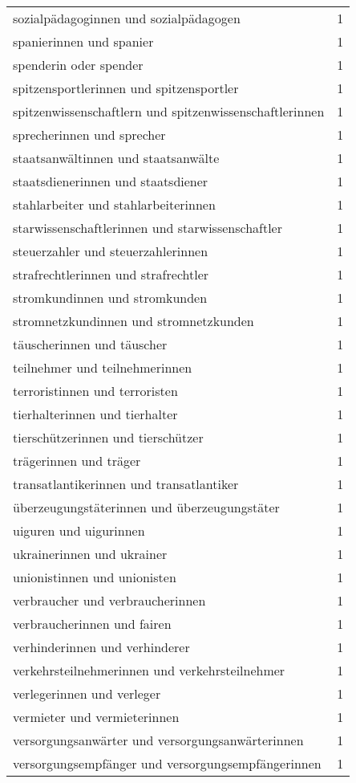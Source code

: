 \begin{tabular}{ll}
sozialpädagoginnen und sozialpädagogen & 1\\
spanierinnen und spanier & 1\\
spenderin oder spender & 1\\
spitzensportlerinnen und spitzensportler & 1\\
spitzenwissenschaftlern und spitzenwissenschaftlerinnen & 1\\
sprecherinnen und sprecher & 1\\
staatsanwältinnen und staatsanwälte & 1\\
staatsdienerinnen und staatsdiener & 1\\
stahlarbeiter und stahlarbeiterinnen & 1\\
starwissenschaftlerinnen und starwissenschaftler & 1\\
steuerzahler und steuerzahlerinnen & 1\\
strafrechtlerinnen und strafrechtler & 1\\
stromkundinnen und stromkunden & 1\\
stromnetzkundinnen und stromnetzkunden & 1\\
täuscherinnen und täuscher & 1\\
teilnehmer und teilnehmerinnen & 1\\
terroristinnen und terroristen & 1\\
tierhalterinnen und tierhalter & 1\\
tierschützerinnen und tierschützer & 1\\
trägerinnen und träger & 1\\
transatlantikerinnen und transatlantiker & 1\\
überzeugungstäterinnen und überzeugungstäter & 1\\
uiguren und uigurinnen & 1\\
ukrainerinnen und ukrainer & 1\\
unionistinnen und unionisten & 1\\
verbraucher und verbraucherinnen & 1\\
verbraucherinnen und fairen & 1\\
verhinderinnen und verhinderer & 1\\
verkehrsteilnehmerinnen und verkehrsteilnehmer & 1\\
verlegerinnen und verleger & 1\\
vermieter und vermieterinnen & 1\\
versorgungsanwärter und versorgungsanwärterinnen & 1\\
versorgungsempfänger und versorgungsempfängerinnen & 1\\

\end{tabular}
